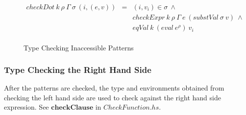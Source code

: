 \begin{figure}[H]
  \begin{equation*}
    \begin{aligned}
      checkDot \: k \: \rho \: \Gamma \: \sigma \: (i,(e,v)) & = & (i,v_i) \in \sigma \: \land                                                 \\
                                                             &   & checkExpr \: k \: \rho \: \Gamma \: e \: (substVal \: \sigma \: v) \: \land \\
                                                             &   & eqVal \: k \: (eval \: e^{\rho}) \: v_i                                     \\
    \end{aligned}
  \end{equation*}
  \caption{Type Checking Inaccessible Patterns}
\end{figure}

\subsubsection{Type Checking the Right Hand Side}

After the patterns are checked, the type and environments obtained from checking the left hand side are used to check against the right hand side expression. See $\boldsymbol{checkClause}$ in $CheckFunction.hs$.